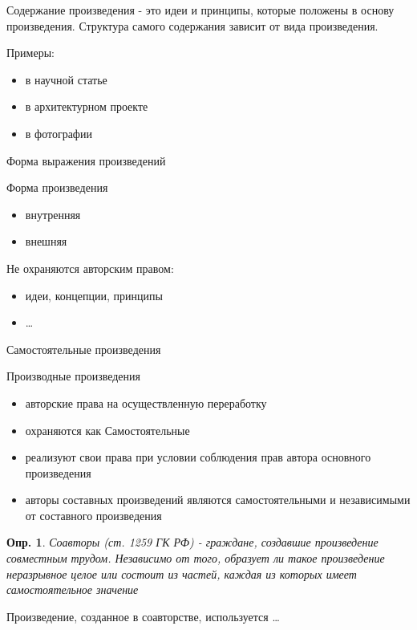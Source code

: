 \documentclass[12pt]{article}
\newtheorem{definition}{Опр.}
\begin{document}
Содержание произведения - это идеи и принципы, которые положены в основу
произведения. Структура самого содержания зависит от вида произведения.

Примеры:
\begin{itemize}
\item в научной статье
\item в архитектурном проекте
\item в фотографии
\end{itemize}

Форма выражения произведений

Форма произведения
\begin{itemize}
\item внутренняя
\item внешняя
\end{itemize}

Не охраняются авторским правом:
\begin{itemize}
\item идеи, концепции, принципы
\item \dots
\end{itemize}

Самостоятельные произведения

Производные произведения
\begin{itemize}
\item авторские права на осуществленную переработку
\item охраняются как Самостоятельные
\item реализуют свои права при условии соблюдения прав автора
основного произведения
\item авторы составных произведений являются самостоятельными
и независимыми от составного произведения
\end{itemize}

\begin{definition}
Соавторы (ст. 1259 ГК РФ) - граждане, создавшие произведение 
совместным трудом. Независимо от того, образует ли такое произведение
неразрывное целое или состоит из частей, каждая из которых имеет 
самостоятельное значение
\end{definition}

Произведение, созданное в соавторстве, используется \dots
\end{document}
